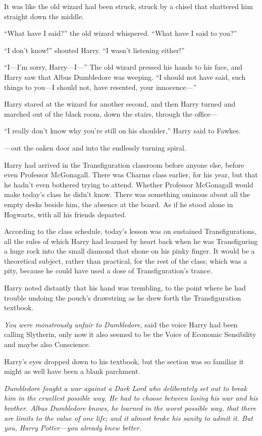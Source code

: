It was like the old wizard had been struck, struck by a chisel that shattered him straight down the middle.

“What have I said?” the old wizard whispered. “What have I said to you?”

“I don’t know!” shouted Harry. “I wasn’t listening either!”

“I—I’m sorry, Harry—I—” The old wizard pressed his hands to his face, and Harry saw that Albus Dumbledore was weeping. “I should not have said, such things to you—I should not, have resented, your innocence—”

Harry stared at the wizard for another second, and then Harry turned and marched out of the black room, down the stairs, through the office—

“I really don’t know why you’re still on his shoulder,” Harry said to Fawkes.

—out the oaken door and into the endlessly turning spiral.

\later

Harry had arrived in the Transfiguration classroom before anyone else, before even Professor McGonagall. There was Charms class earlier, for his year, but that he hadn’t even bothered trying to attend. Whether Professor McGonagall would make today’s class he didn’t know. There was something ominous about all the empty desks beside him, the absence at the board. As if he stood alone in Hogwarts, with all his friends departed.

According to the class schedule, today’s lesson was on sustained Transfigurations, all the rules of which Harry had learned by heart back when he was Transfiguring a huge rock into the small diamond that shone on his pinky finger. It would be a theoretical subject, rather than practical, for the rest of the class; which was a pity, because he could have used a dose of Transfiguration’s trance.

Harry noted distantly that his hand was trembling, to the point where he had trouble undoing the pouch’s drawstring as he drew forth the Transfiguration textbook.

\emph{You were monstrously unfair to Dumbledore,} said the voice Harry had been calling Slytherin, only now it also seemed to be the Voice of Economic Sensibility and maybe also Conscience.

Harry’s eyes dropped down to his textbook, but the section was so familiar it might as well have been a blank parchment.

\emph{Dumbledore fought a war against a Dark Lord who deliberately set out to break him in the cruellest possible way. He had to choose between losing his war and his brother. Albus Dumbledore knows, he learned in the worst possible way, that there are limits to the value of one life; and it almost broke his sanity to admit it. But you, Harry Potter—\emph{you} already knew better.}

